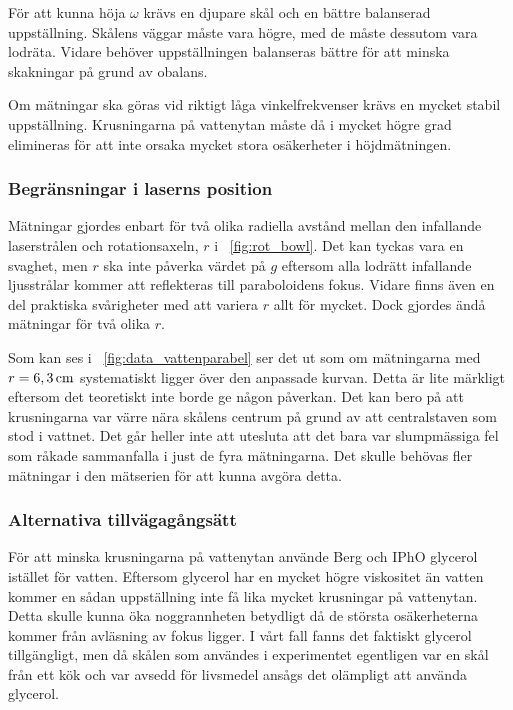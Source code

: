 \documentclass[11pt,a4paper]{article}
\newcommand{\figref}{\figurename~\ref}
\begin{document}
För att kunna höja $\omega$ krävs en djupare skål och en bättre balanserad uppställning. Skålens väggar måste vara högre, med de måste dessutom vara lodräta. Vidare behöver uppställningen balanseras bättre för att minska skakningar på grund av obalans. 

Om mätningar ska göras vid riktigt låga vinkelfrekvenser krävs en mycket stabil uppställning. Krusningarna på vattenytan måste då i mycket högre grad elimineras för att inte orsaka mycket stora osäkerheter i höjdmätningen. 



\subsubsection{Begränsningar i laserns position}

Mätningar gjordes enbart för två olika radiella avstånd mellan den infallande laserstrålen och rotationsaxeln, $r$ i \figref{fig:rot_bowl}. Det kan tyckas vara en svaghet, men $r$ ska inte påverka värdet på $g$ eftersom alla lodrätt infallande ljusstrålar kommer att reflekteras till paraboloidens fokus. Vidare finns även en del praktiska svårigheter med att variera $r$ allt för mycket. %
Dock gjordes ändå mätningar för två olika $r$. 

Som kan ses i \figref{fig:data_vattenparabel} ser det ut som om mätningarna med $r=\unit[6,3]{cm}$ systematiskt ligger över den anpassade kurvan. Detta är lite märkligt eftersom det teoretiskt inte borde ge någon påverkan. Det kan bero på att krusningarna var värre nära skålens centrum på grund av att centralstaven som stod i vattnet. Det går heller inte att utesluta att det bara var slumpmässiga fel som råkade sammanfalla i just de fyra mätningarna. Det skulle behövas fler mätningar i den mätserien för att kunna avgöra detta.

\subsubsection{Alternativa tillvägagångsätt}
För att minska krusningarna på vattenytan använde Berg\cite{Berg1990} och IPhO\cite{IPhO2001} glycerol istället för vatten. Eftersom glycerol har en mycket högre viskositet än vatten kommer en sådan uppställning inte få lika mycket krusningar på vattenytan.
Detta skulle kunna öka noggrannheten betydligt då de största osäkerheterna kommer från avläsning av fokus ligger. I vårt fall fanns det faktiskt glycerol tillgängligt, men då skålen som användes i experimentet egentligen var en skål från ett kök och var avsedd för livsmedel ansågs det olämpligt att använda glycerol.
\end{document}
